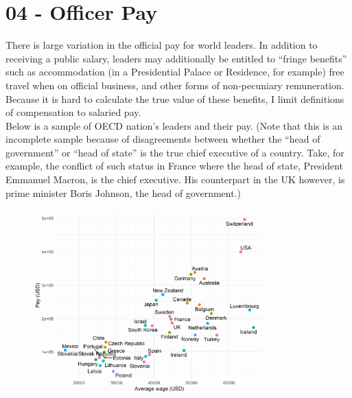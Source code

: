 \documentclass[11pt, letterpaper, twoside]{article}
\begin{document}


\section{04 - Officer Pay}
There is large variation in the official pay for world leaders. In addition to receiving a public salary, leaders may additionally be entitled to ``fringe benefits'' such as accommodation (in a Presidential Palace or Residence, for example) free travel when on official business, and other forms of non-pecuniary remuneration. Because it is hard to calculate the true value of these benefits, I limit definitions of compensation to salaried pay.\\

Below is a sample of OECD nation's leaders and their pay. (Note that this is an incomplete sample because of disagreements between whether the ``head of government'' or ``head of state'' is the true chief executive of a country. Take, for example, the conflict of such status in France where the head of state, President Emmanuel Macron, is the chief executive. His counterpart in the UK however, is prime minister Boris Johnson, the head of government.)

\begin{figure}
    \centering
    \includegraphics[clip, width=0.8\textwidth]{figures/leader_pay.png}

\end{figure}





\nocite{bell2016rulers}
\newpage


\newpage
\end{document}

